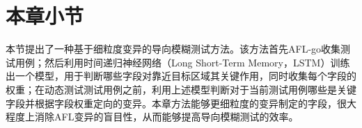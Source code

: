 \section{本章小节}

本节提出了一种基于细粒度变异的导向模糊测试方法。该方法首先AFL-go收集测试用例；然后利用时间递归神经网络（Long Short-Term Memory，LSTM）训练出一个模型，用于判断哪些字段对靠近目标区域其关键作用，同时收集每个字段的权重；在动态测试测试用例之前，利用上述模型判断对于当前测试用例哪些是关键字段并根据字段权重定向的变异。本章方法能够更细粒度的变异制定的字段，很大程度上消除AFL变异的盲目性，从而能够提高导向模糊测试的效率。